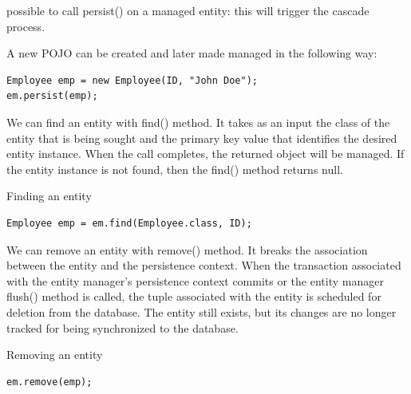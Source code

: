 possible to call persist() on a managed entity: this will trigger the cascade process. 
\begin{example}
    A new POJO can be created and later made managed in the following way: 
    \begin{lstlisting}[style=Java]
Employee emp = new Employee(ID, "John Doe"); 
em.persist(emp);
    \end{lstlisting}
\end{example}
We can find an entity with find() method. It  takes as an input the class of the entity that is being sought and the primary key value that identifies the desired 
entity instance. When the call completes, the returned object will be managed. If the entity instance is not found, then the find() method returns null. 
\begin{example}
    Finding an entity
    \begin{lstlisting}[style=Java]
Employee emp = em.find(Employee.class, ID);
    \end{lstlisting}
\end{example}
We can remove an entity with remove() method. It breaks the association between the entity and the persistence context. When the transaction associated with the 
entity manager's persistence context commits or the entity manager flush() method is called, the tuple associated with the entity is scheduled for deletion from
the database. The entity still exists, but its changes are no longer tracked for being synchronized to the database.
\begin{example}
    Removing an entity
    \begin{lstlisting}[style=Java]
em.remove(emp);
    \end{lstlisting}
\end{example}

